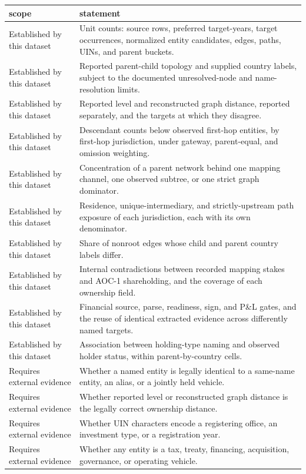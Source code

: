 \begin{tabular}{ll}
\toprule
scope & statement \\
\midrule
Established by this dataset & Unit counts: source rows, preferred target-years, target occurrences, normalized entity candidates, edges, paths, UINs, and parent buckets. \\
Established by this dataset & Reported parent-child topology and supplied country labels, subject to the documented unresolved-node and name-resolution limits. \\
Established by this dataset & Reported level and reconstructed graph distance, reported separately, and the targets at which they disagree. \\
Established by this dataset & Descendant counts below observed first-hop entities, by first-hop jurisdiction, under gateway, parent-equal, and omission weighting. \\
Established by this dataset & Concentration of a parent network behind one mapping channel, one observed subtree, or one strict graph dominator. \\
Established by this dataset & Residence, unique-intermediary, and strictly-upstream path exposure of each jurisdiction, each with its own denominator. \\
Established by this dataset & Share of nonroot edges whose child and parent country labels differ. \\
Established by this dataset & Internal contradictions between recorded mapping stakes and AOC-1 shareholding, and the coverage of each ownership field. \\
Established by this dataset & Financial source, parse, readiness, sign, and P\&L gates, and the reuse of identical extracted evidence across differently named targets. \\
Established by this dataset & Association between holding-type naming and observed holder status, within parent-by-country cells. \\
Requires external evidence & Whether a named entity is legally identical to a same-name entity, an alias, or a jointly held vehicle. \\
Requires external evidence & Whether reported level or reconstructed graph distance is the legally correct ownership distance. \\
Requires external evidence & Whether UIN characters encode a registering office, an investment type, or a registration year. \\
Requires external evidence & Whether any entity is a tax, treaty, financing, acquisition, governance, or operating vehicle. \\

\end{tabular}
